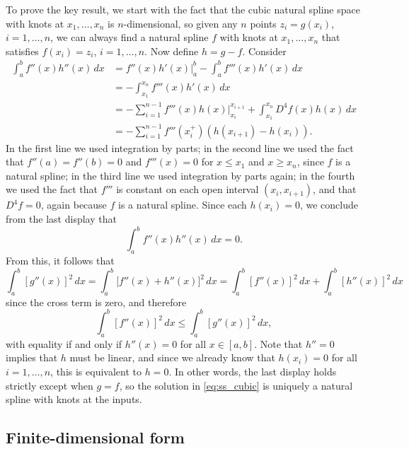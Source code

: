 \documentclass{article}
\begin{document}
To prove the key result, we start with the fact that the cubic natural spline
space with knots at $x_1,\dots,x_n$ is $n$-dimensional, so given any $n$ points
$z_i = g(x_i)$, $i=1,\dots,n$, we can always find a natural spline $f$ with
knots at $x_1,\dots,x_n$ that satisfies $f(x_i) = z_i$, $i=1,\dots,n$. Now
define $h = g-f$. Consider
\begin{align*}
\int_a^b f''(x) h''(x) \, dx 
&= f''(x) h'(x) \Big|_a^b - \int_a^b f'''(x) h'(x) \, dx \\
&= -\int_{x_1}^{x_n} f'''(x) h'(x) \, dx \\ 
&= -\sum_{i=1}^{n-1} f'''(x) h(x) \Big|_{x_i}^{x_{i+1}} +  
\int_{x_1}^{x_n} D^4 f(x) h(x) \, dx \\
&= -\sum_{i=1}^{n-1} f'''(x_i^+) (h(x_{i+1}) - h(x_i)).
\end{align*}
In the first line we used integration by parts; in the second line we used the
fact that $f''(a) = f''(b) = 0$ and $f'''(x)=0$ for $x \leq x_1$ and $x \geq
x_n$, since $f$ is a natural spline; in the third line we used integration by
parts again; in the fourth we used the fact that $f'''$ is constant on each open
interval $(x_i,x_{i+1})$, and that $D^4 f=0$, again because $f$ is a natural
spline. Since each $h(x_i)=0$, we conclude from the last display that
\[
\int_a^b f''(x) h''(x) \, dx = 0.
\]
From this, it follows that
\[
\int_a^b [g''(x)]^2 \, dx 
= \int_a^b \big[ f''(x) + h''(x) \big]^2 \, dx 
= \int_a^b [f''(x)]^2 \, dx + \int_a^b [h''(x)]^2 \, dx
\]
since the cross term is zero, and therefore 
\[
\int_a^b [f''(x)]^2 \, dx \leq \int_a^b [g''(x)]^2 \, dx,
\]
with equality if and only if $h''(x)=0$ for all $x \in [a,b]$. Note that $h''=0$
implies that $h$ must be linear, and since we already know that $h(x_i)=0$ for
all $i=1,\dots,n$, this is equivalent to $h=0$. In other words, the last display
holds strictly except when $g=f$, so the solution in \eqref{eq:ss_cubic} is
uniquely a natural spline with knots at the inputs. 

\subsection{Finite-dimensional form}
\end{document}
